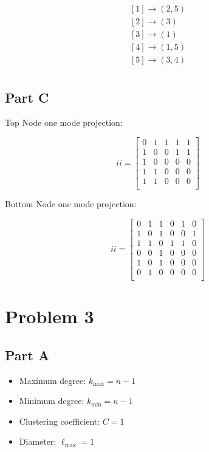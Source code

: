 \documentclass[12pt]{article}
\begin{document}
\[
\begin{matrix}
[1] \to (2, 5) \\
[2] \to (3) \\
[3] \to (1) \\
[4] \to (1, 5) \\
[5] \to (3, 4) \\
\end{matrix}
\]

\subsection*{Part C}

Top Node one mode projection:

\[
ii = \begin{bmatrix}
0 & 1 & 1 & 1 & 1 \\
1 & 0 & 0 & 1 & 1 \\
1 & 0 & 0 & 0 & 0 \\
1 & 1 & 0 & 0 & 0 \\
1 & 1 & 0 & 0 & 0 \\
\end{bmatrix}
\]

\noindent Bottom Node one mode projection:

\[
ii = \begin{bmatrix}
0 & 1 & 1 & 0 & 1 & 0 \\
1 & 0 & 1 & 0 & 0 & 1 \\
1 & 1 & 0 & 1 & 1 & 0 \\
0 & 0 & 1 & 0 & 0 & 0 \\
1 & 0 & 1 & 0 & 0 & 0 \\
0 & 1 & 0 & 0 & 0 & 0 \\
\end{bmatrix}
\]

\section*{Problem 3}


\subsection*{Part A}


\begin{itemize}
    \item Maximum degree: $k_{\max} = n-1$
    \item Minimum degree: $k_{\min} = n-1$
    \item Clustering coefficient: $C = 1$
    \item Diameter: $\ell_{\max} = 1$
\end{itemize}
\end{document}
